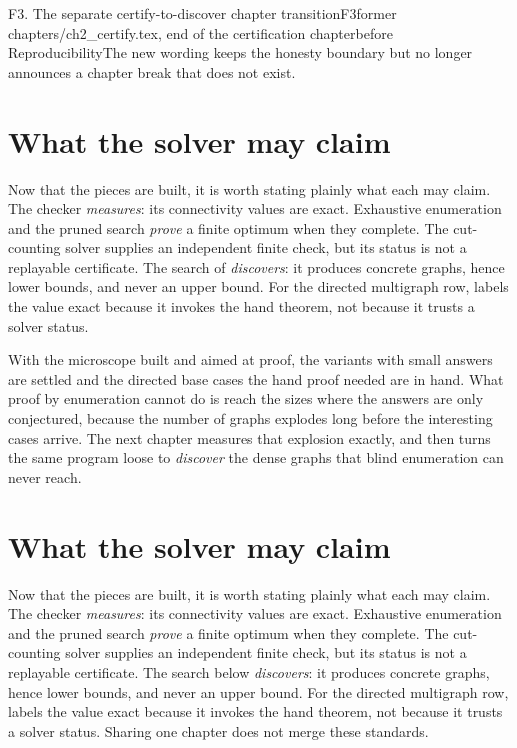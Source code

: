 \begin{offcutrewrite}{F3. The separate certify-to-discover chapter transition}{F3}{former chapters/ch2\_certify.tex, end of the certification chapter}{before Reproducibility}{The new wording keeps the honesty boundary but no longer announces a chapter break that does not exist.}
\section{What the solver may claim}

Now that the pieces are built, it is worth stating plainly what each may claim. The checker \emph{measures}: its connectivity values are exact. Exhaustive enumeration and the pruned search \emph{prove} a finite optimum when they complete. The cut-counting solver supplies an independent finite check, but its status is not a replayable certificate. The search of  \emph{discovers}: it produces concrete graphs, hence lower bounds, and never an upper bound. For the directed multigraph row,  labels the value exact because it invokes the hand theorem, not because it trusts a solver status.

With the microscope built and aimed at proof, the variants with small answers are settled and the directed base cases the hand proof needed are in hand. What proof by enumeration cannot do is reach the sizes where the answers are only conjectured, because the number of graphs explodes long before the interesting cases arrive. The next chapter measures that explosion exactly, and then turns the same program loose to \emph{discover} the dense graphs that blind enumeration can never reach.
\nowreads
\section{What the solver may claim}

Now that the pieces are built, it is worth stating plainly what each may claim. The checker \emph{measures}: its connectivity values are exact. Exhaustive enumeration and the pruned search \emph{prove} a finite optimum when they complete. The cut-counting solver supplies an independent finite check, but its status is not a replayable certificate. The search below \emph{discovers}: it produces concrete graphs, hence lower bounds, and never an upper bound. For the directed multigraph row,  labels the value exact because it invokes the hand theorem, not because it trusts a solver status. Sharing one chapter does not merge these standards.
\end{offcutrewrite}

